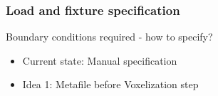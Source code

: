 \begin{frame}
	\frametitle{Load and fixture specification}
	\begin{minipage}{0.85\textwidth}
	Boundary conditions required - how to specify?
		\begin{itemize}
		\item Current state: Manual specification
		\item Idea 1: Metafile before Voxelization step
		\end{itemize}
		
	\end{minipage}
	\begin{minipage}{0.14\textwidth}
		\begin{figure}
			\\
			\\

\end{figure}
\end{minipage}
\end{frame}
